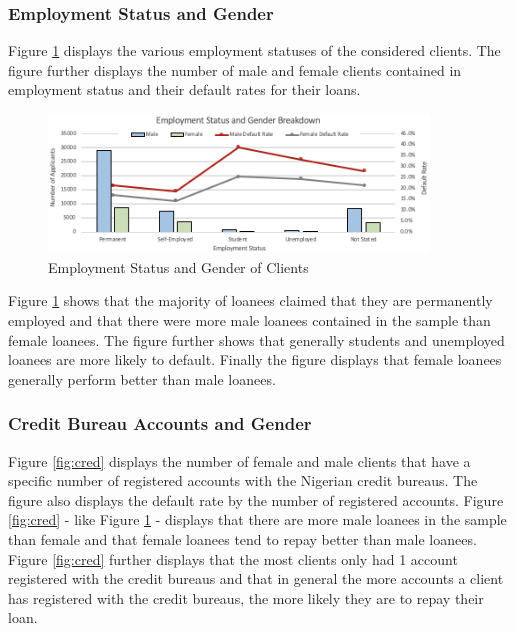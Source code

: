 \vspace{10 pt}

\subsubsection{Employment Status and Gender}

Figure \ref{fig:employment} displays the various employment statuses of the considered clients. The figure further displays the number of male and female clients contained in employment status and their default rates for their loans. 

\vspace{10 pt}

\begin{figure}[!htb]
\centering
\includegraphics[width=0.9\textwidth]{images/employment.png}
\caption{Employment Status and Gender of Clients}
\label{fig:employment}
\end{figure}

\vspace{10 pt}

Figure \ref{fig:employment} shows that the majority of loanees claimed that they are permanently employed and that there were more male loanees contained in the sample than female loanees. The figure further shows that generally students and unemployed loanees are more likely to default. Finally the figure displays that female loanees generally perform better than male loanees.  

\subsubsection{Credit Bureau Accounts and Gender}


Figure \ref{fig:cred} displays the number of female and male clients that have a specific number of registered accounts with the Nigerian credit bureaus. The figure also displays the default rate by the number of registered accounts. Figure \ref{fig:cred} - like Figure \ref{fig:employment} - displays that there are more male loanees in the sample than female and that female loanees tend to repay better than male loanees. Figure \ref{fig:cred} further displays that the most clients only had 1 account registered with the credit bureaus and that in general the more accounts a client has registered with the credit bureaus, the more likely they are to repay their loan.  


